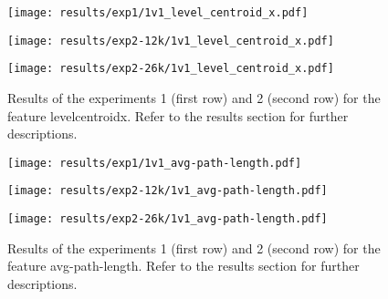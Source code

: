 \begin{figure}[h!]
	\centering
	\begin{minipage}{0.4\linewidth}
		\texttt{[image: results/exp1/1v1\_level\_centroid\_x.pdf]}
	\end{minipage}
	
	\begin{minipage}{0.4\linewidth}
		\texttt{[image: results/exp2-12k/1v1\_level\_centroid\_x.pdf]}
	\end{minipage}
	\begin{minipage}{0.4\linewidth}
		\texttt{[image: results/exp2-26k/1v1\_level\_centroid\_x.pdf]}
	\end{minipage}
	
	\caption[ Results: Feature level\textunderscore centroid\textunderscore x]{ Results of the experiments 1 (first row) and 2 (second row) for the feature level\textunderscore centroid\textunderscore x. Refer to the results section for further descriptions. }
	\label{fig:appendix_level_centroid_x}
\end{figure}
\newpage 


\begin{figure}[h!]
	\centering
	\begin{minipage}{0.4\linewidth}
		\texttt{[image: results/exp1/1v1\_avg-path-length.pdf]}
	\end{minipage}
	
	\begin{minipage}{0.4\linewidth}
		\texttt{[image: results/exp2-12k/1v1\_avg-path-length.pdf]}
	\end{minipage}
	\begin{minipage}{0.4\linewidth}
		\texttt{[image: results/exp2-26k/1v1\_avg-path-length.pdf]}
	\end{minipage}
	
	\caption[ Results: Feature avg-path-length]{ Results of the experiments 1 (first row) and 2 (second row) for the feature avg-path-length. Refer to the results section for further descriptions. }
	\label{fig:appendix_avg-path-length}
\end{figure}

